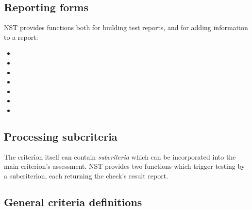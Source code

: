 \subsection{Reporting forms}
\label{sec:criteria-forms-report}
NST provides functions both for building test reports, and for adding
information to a report:
\begin{itemize}
\item
  
\item
  
\item
  
\item
  
\item
  
\item
  
\item
  
\end{itemize}

\subsection{Processing subcriteria}
\label{sec:subcriteria}
The criterion itself can contain \emph{subcriteria} which can be
incorporated into the main criterion's assessment.  NST provides two
functions which trigger testing by a subcriterion, each returning the
check's result report.
\par
%
\par
%

\subsection{General criteria definitions}
\label{sec:def-criterion}
%

